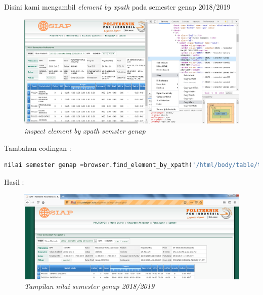 \begin{enumerate}
Disini kami mengambil \textit{element by xpath} pada semester genap 2018/2019
\begin{figure}[H]
    	\centering
    	\includegraphics[scale=0.3]{Figures/figures/semestergenap.png}
    	\caption{\textit{inspect element by xpath semster genap}}
    	\label{CLI}
	\end{figure}

Tambahan codingan :
\begin{lstlisting}[language=Python]
nilai semester genap =browser.find_element_by_xpath('/html/body/table/tbody/tr[5]/td/table[3]/tbody/tr[1]/td[2]/p[1]/table/tbody/tr/td[3]/select/option[4]').click()
\end{lstlisting}

\newpage

Hasil :
\begin{figure}[H]
    	\centering
    	\includegraphics[scale=0.3]{Figures/figures/hasilnilai2.png}
    	\caption{\textit{Tampilan nilai semester genap 2018/2019}}
    	\label{CLI}
	\end{figure}




\end{enumerate}
